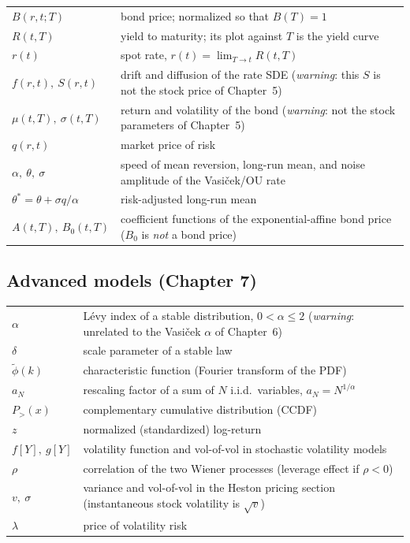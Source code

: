 \begin{center}
\begin{tabular}{l p{10.2cm}}
\hline
$B(r,t;T)$ & bond price; normalized so that $B(T)=1$ \\
$R(t,T)$ & yield to maturity; its plot against $T$ is the yield curve \\
$r(t)$ & spot rate, $r(t)=\lim_{T\to t}R(t,T)$ \\
$f(r,t),\ S(r,t)$ & drift and diffusion of the rate SDE
  (\emph{warning}: this $S$ is not the stock price of Chapter~5) \\
$\mu(t,T),\ \sigma(t,T)$ & return and volatility of the bond
  (\emph{warning}: not the stock parameters of Chapter~5) \\
$q(r,t)$ & market price of risk \\
$\alpha,\ \theta,\ \sigma$ & speed of mean reversion, long-run mean, and noise amplitude of the Vasi\v{c}ek/OU rate \\
$\theta^* = \theta + \sigma q/\alpha$ & risk-adjusted long-run mean \\
$A(t,T),\ B_0(t,T)$ & coefficient functions of the exponential-affine bond price
  ($B_0$ is \emph{not} a bond price) \\
\hline
\end{tabular}
\end{center}

\subsection*{Advanced models (Chapter 7)}

\begin{center}
\begin{tabular}{l p{10.2cm}}
\hline
$\alpha$ & L\'evy index of a stable distribution, $0<\alpha\le2$
  (\emph{warning}: unrelated to the Vasi\v{c}ek $\alpha$ of Chapter~6) \\
$\delta$ & scale parameter of a stable law \\
$\tilde\phi(k)$ & characteristic function (Fourier transform of the PDF) \\
$a_N$ & rescaling factor of a sum of $N$ i.i.d.\ variables, $a_N=N^{1/\alpha}$ \\
$P_>(x)$ & complementary cumulative distribution (CCDF) \\
$z$ & normalized (standardized) log-return \\
$f[Y],\ g[Y]$ & volatility function and vol-of-vol in stochastic volatility models \\
$\rho$ & correlation of the two Wiener processes (leverage effect if $\rho<0$) \\
$v,\ \sigma$ & variance and vol-of-vol in the Heston pricing section (instantaneous stock volatility is $\sqrt v$) \\
$\lambda$ & price of volatility risk \\
\hline
\end{tabular}
\end{center}

